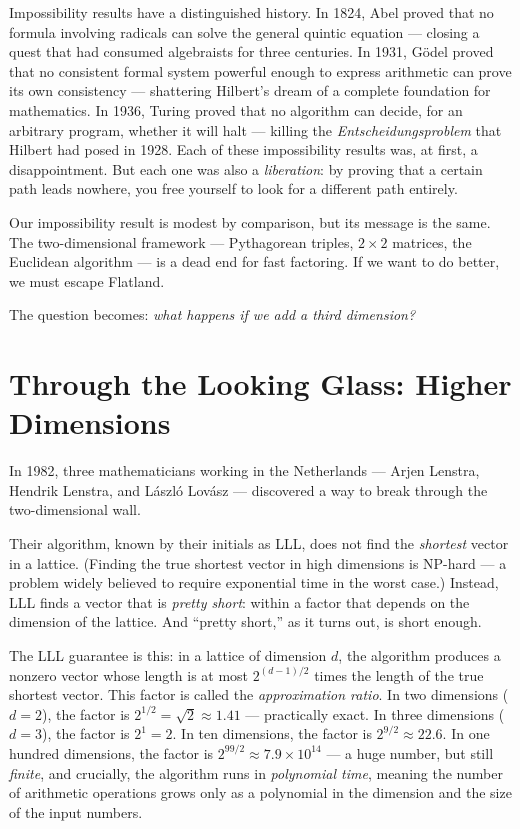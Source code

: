 Impossibility results have a distinguished history. In 1824, Abel proved that no formula involving radicals can solve the general quintic equation --- closing a quest that had consumed algebraists for three centuries. In 1931, Gödel proved that no consistent formal system powerful enough to express arithmetic can prove its own consistency --- shattering Hilbert's dream of a complete foundation for mathematics. In 1936, Turing proved that no algorithm can decide, for an arbitrary program, whether it will halt --- killing the \emph{Entscheidungsproblem} that Hilbert had posed in 1928. Each of these impossibility results was, at first, a disappointment. But each one was also a \emph{liberation}: by proving that a certain path leads nowhere, you free yourself to look for a different path entirely.

Our impossibility result is modest by comparison, but its message is the same. The two-dimensional framework --- Pythagorean triples, \(2 \times 2\) matrices, the Euclidean algorithm --- is a dead end for fast factoring. If we want to do better, we must escape Flatland.

The question becomes: \emph{what happens if we add a third dimension?}



\section{Through the Looking Glass: Higher Dimensions}\label{ch2-through-the-looking-glass-higher-dimensions}

In 1982, three mathematicians working in the Netherlands --- Arjen Lenstra, Hendrik Lenstra, and László Lovász --- discovered a way to break through the two-dimensional wall.

Their algorithm, known by their initials as LLL, does not find the \emph{shortest} vector in a lattice. (Finding the true shortest vector in high dimensions is NP-hard --- a problem widely believed to require exponential time in the worst case.) Instead, LLL finds a vector that is \emph{pretty short}: within a factor that depends on the dimension of the lattice. And ``pretty short,'' as it turns out, is short enough.

The LLL guarantee is this: in a lattice of dimension \(d\), the algorithm produces a nonzero vector whose length is at most \(2^{(d-1)/2}\) times the length of the true shortest vector. This factor is called the \emph{approximation ratio}. In two dimensions (\(d = 2\)), the factor is \(2^{1/2} = \sqrt{2} \approx 1.41\) --- practically exact. In three dimensions (\(d = 3\)), the factor is \(2^1 = 2\). In ten dimensions, the factor is \(2^{9/2} \approx 22.6\). In one hundred dimensions, the factor is \(2^{99/2} \approx 7.9 \times 10^{14}\) --- a huge number, but still \emph{finite}, and crucially, the algorithm runs in \emph{polynomial time}, meaning the number of arithmetic operations grows only as a polynomial in the dimension and the size of the input numbers.

